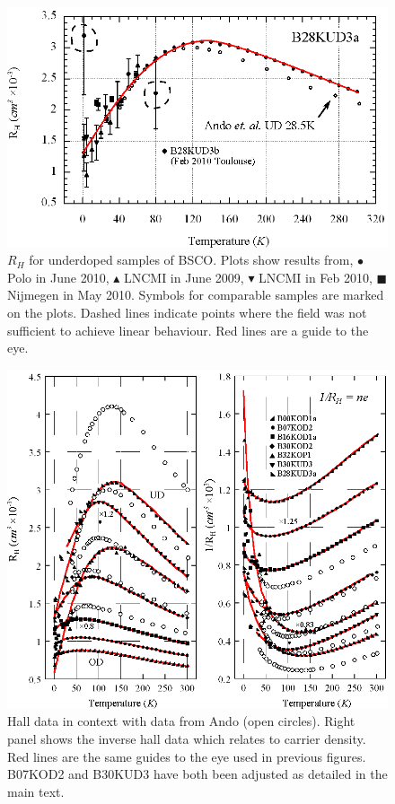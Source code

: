 \begin{figure}[htbp]
	\begin{center}
		\includegraphics[scale=0.9]{Chapter-HallBSCO/Figures/HallIndividual/HallIndividualUD}
		\caption{$R_H$ for underdoped samples of \ac{BSCO}. Plots show results from, $\bullet$ Polo in June 2010, $\blacktriangle$ \ac{LNCMI} in June 2009, $\blacktriangledown$ \ac{LNCMI} in Feb 2010, $\blacksquare$ Nijmegen in May 2010. Symbols for comparable samples are marked on the plots. Dashed lines indicate points where the field was not sufficient to achieve linear behaviour. Red lines are a guide to the eye.}
		\label{Fig:ExpH:HallIndividualUD}
	\end{center}
\end{figure}
\begin{figure}[htbp]
	\begin{center}
		\includegraphics[scale=0.9]{Chapter-HallBSCO/Figures/InvHallCombined/InvHallCombined}
		\caption{Hall data in context with data from Ando \etal\cite{Ando1999} (open circles). Right panel shows the inverse hall data which relates to carrier density. Red lines are the same guides to the eye used in previous figures. B07KOD2 and B30KUD3 have both been adjusted as detailed in the main text.}
		\label{Fig:ExpH:InvHallCombined}
	\end{center}
\end{figure}

